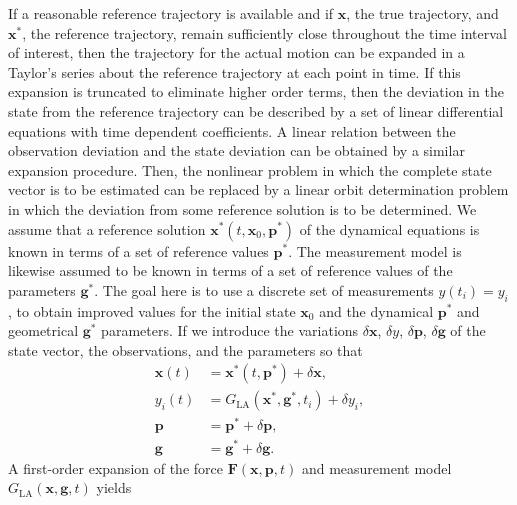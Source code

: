 \documentclass[lineno, pdflatex,sn-mathphys-ay]{sn-jnl}
\theoremstyle{thmstyleone}%
\theoremstyle{thmstyletwo}%
\theoremstyle{thmstylethree}%
\renewcommand{\vec}[1]{\boldsymbol{#1}}
\begin{document}
If a reasonable reference trajectory is available and if $\vec{x}$, the true trajectory, and $\vec{x}^*$,
the reference trajectory, remain sufficiently close throughout the time interval of interest, then the trajectory for the actual motion can be expanded in a Taylor's series about the reference trajectory at each point in time. If this expansion is truncated to eliminate higher order terms, then the deviation in the state from the reference trajectory can be described by a set of linear differential equations with time dependent coefficients. A linear relation between the observation deviation and the state deviation can be obtained by a similar expansion procedure. Then, the nonlinear problem in which the complete state vector is to be estimated can be replaced by a linear orbit determination problem in which the deviation from some reference solution is to be determined.
We assume that a reference solution $\vec{x}^* (t, \vec{x}_0 , \vec{p}^* )$ of the dynamical equations is known in terms of a set of reference values $\vec{p}^*$. The measurement model is likewise assumed to be known in terms of a set of reference values of the parameters $\vec{g}^*$. 
The goal here is to use a discrete set of measurements ${{y}(t_i) = {y}_i}$, to obtain improved values for the initial state $\vec{x}_0$ and the dynamical $\vec{p}^*$ and geometrical $\vec{g}^*$ parameters.
%
If we introduce the variations \( \delta \vec{x} \), \( \delta {y} \), \( \delta \vec{p} \), \( \delta \vec{g} \) of the state vector, the observations, and the parameters so that
%
\begin{subequations}
\begin{align}
	\vec{x}(t) &= \vec{x}^*(t, \vec{p}^*) + \delta \vec{x}, \\
	{y}_i(t) &= {G}_{\mathrm{LA}}(\vec{x}^*, \vec{g}^*, t_i) + \delta {y}_i, \\
	\vec{p} &= \vec{p}^* + \delta \vec{p}, \\
	\vec{g} &= \vec{g}^* + \delta \vec{g}.
\end{align}
\end{subequations}
%
A first-order expansion of the force ${ \vec{F}(\vec{x}, \vec{p}, t ) }$ and measurement model ${ {G}_{\mathrm{LA}}(\vec{x}, \vec{g}, t ) }$ yields
\end{document}
